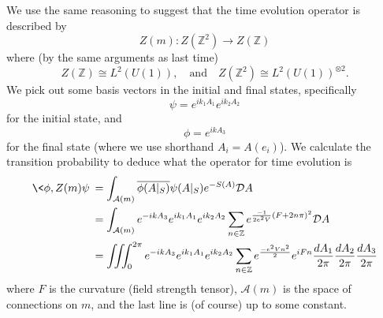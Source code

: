 We use the same reasoning to suggest that the time evolution
operator is described by
\begin{equation}%
Z(m):Z(\mathbb{Z}^{2})\to Z(\mathbb{Z})
\end{equation}
where (by the same arguments as last time)
\begin{equation}%
Z(\mathbb{Z})\cong L^{2}(U(1)),\quad\text{and}\quad
Z(\mathbb{Z}^{2})\cong L^{2}(U(1))^{\otimes 2}.
\end{equation}
We pick out some basis vectors in the initial and final states,
specifically
\begin{equation}%
\psi = e^{ik_{1}A_{1}}e^{ik_{2}A_{2}}
\end{equation}
for the initial state, and
\begin{equation}%
\phi = e^{ikA_{3}}
\end{equation}
for the final state (where we use shorthand $A_{i}=A(e_{i})$). We
calculate the transition probability to deduce what the operator
for time evolution is
\begin{subequations}
\begin{align}
\<\phi,Z(m)\psi\> &= \int_{\mathcal{A}(m)}\overline{\phi(A|_{S})}\psi(A|_{S})e^{-S(A)}\mathcal{D}A\\
&= \int_{\mathcal{A}(m)}
e^{-ikA_{3}}e^{ik_{1}A_{1}}e^{ik_{2}A_{2}}\sum_{n\in\mathbb{Z}}e^{\frac{-1}{2e^{2}V}(F+2n\pi)^{2}}\mathcal{D}A\\
&= \iiint^{2\pi}_{0}
e^{-ikA_{3}}e^{ik_{1}A_{1}}e^{ik_{2}A_{2}}\sum_{n\in\mathbb{Z}}e^{\frac{-e^{2}Vn^{2}}{2}}e^{iFn} \frac{dA_{1}}{2\pi}\frac{dA_{2}}{2\pi}\frac{dA_{3}}{2\pi}
\end{align}
\end{subequations}
where $F$ is the curvature (field strength tensor),
$\mathcal{A}(m)$ is the space of connections on $m$, and the last
line is (of course) up to some constant.


